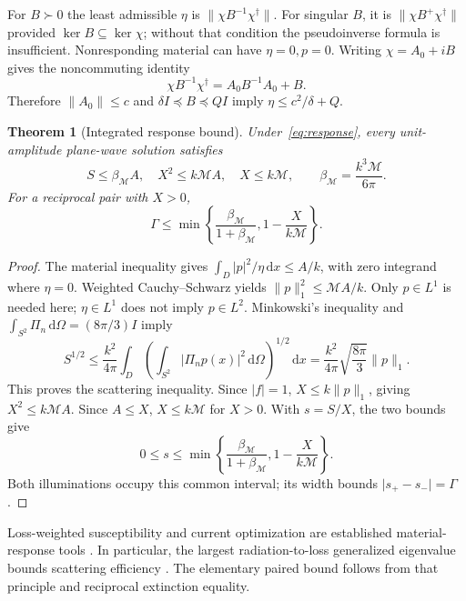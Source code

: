 \documentclass[11pt]{article}
\newtheorem{theorem}{Theorem}[section]
\newcommand{\dd}{\,\mathrm{d}}
\newcommand{\norm}[1]{\lVert #1\rVert}
\newcommand{\abs}[1]{\lvert #1\rvert}
\begin{document}
For $B\succ0$ the least admissible $\eta$ is $\norm{\chi B^{-1}\chi^\dagger}$. For singular $B$, it is $\norm{\chi B^+\chi^\dagger}$ provided $\ker B\subseteq\ker\chi$; without that condition the pseudoinverse formula is insufficient. Nonresponding material can have $\eta=0,p=0$. Writing $\chi=A_0+iB$ gives the noncommuting identity
\begin{equation}\label{eq:response-identity}
 \chi B^{-1}\chi^\dagger=A_0B^{-1}A_0+B.
\end{equation}
Therefore $\norm{A_0}\leq c$ and $\delta I\preceq B\preceq QI$ imply $\eta\leq c^2/\delta+Q$.

\begin{theorem}[Integrated response bound]\label{thm:response}
Under~\eqref{eq:response}, every unit-amplitude plane-wave solution satisfies
\begin{equation}\label{eq:response-bounds}
 S\leq\beta_{\mathcal M}A,\quad X^2\leq k\mathcal M A,\quad
 X\leq k\mathcal M,\qquad \beta_{\mathcal M}=\frac{k^3\mathcal M}{6\pi}.
\end{equation}
For a reciprocal pair with $X>0$,
\begin{equation}\label{eq:response-gamma}
 \Gamma\leq\min\left\{\frac{\beta_{\mathcal M}}{1+\beta_{\mathcal M}},
                          1-\frac{X}{k\mathcal M}\right\}.
\end{equation}
\end{theorem}
\begin{proof}
The material inequality gives $\int_D\abs p^2/\eta\dd x\leq A/k$, with zero integrand where $\eta=0$. Weighted Cauchy--Schwarz yields $\norm p_1^2\leq\mathcal M A/k$. Only $p\in L^1$ is needed here; $\eta\in L^1$ does not imply $p\in L^2$. Minkowski's inequality and $\int_{S^2}\Pi_n\dd\Omega=(8\pi/3)I$ imply
\[
 S^{1/2}\leq\frac{k^2}{4\pi}\int_D
 \left(\int_{S^2}\abs{\Pi_np(x)}^2\dd\Omega\right)^{1/2}\dd x
 =\frac{k^2}{4\pi}\sqrt{\frac{8\pi}{3}}\norm p_1.
\]
This proves the scattering inequality. Since $\abs f=1$, $X\leq k\norm p_1$, giving $X^2\leq k\mathcal M A$. Since $A\leq X$, $X\leq k\mathcal M$ for $X>0$. With $s=S/X$, the two bounds give
\[
 0\leq s\leq\min\left\{\frac{\beta_{\mathcal M}}{1+\beta_{\mathcal M}},
                         1-\frac{X}{k\mathcal M}\right\}.
\]
Both illuminations occupy this common interval; its width bounds $\abs{s_+-s_-}=\Gamma$.
\end{proof}

Loss-weighted susceptibility and current optimization are established material-response tools \citep{Miller2016,Schab2020,Gustafsson2020,Kuang2020}. In particular, the largest radiation-to-loss generalized eigenvalue bounds scattering efficiency \citep[Sec.~3.1]{Schab2020}. The elementary paired bound follows from that principle and reciprocal extinction equality.
\end{document}
